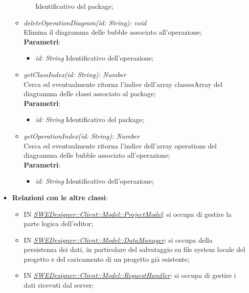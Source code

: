 \documentclass[../DefinizioneDiProdotto.tex]{subfiles}
\begin{document}
\begin{itemize}
\begin{itemize}
\begin{itemize}
								Identificativo del package; \\
							\end{itemize}
							\item \emph{deleteOperationDiagram(id: String): void} \\
							Elimina il diagramma delle bubble associato all'operazione; \\
							\textbf{Parametri}:
							\begin{itemize}
								\item \emph{id: String}
								Identificativo dell'operazione; \\
							\end{itemize}
							\item \emph{getClassIndex(id: String): Number} \\
							Cerca ed eventualmente ritorna l'indice dell'array classesArray del diagramma delle classi associato al package; \\
							\textbf{Parametri}:
							\begin{itemize}
								\item \emph{id: String}
								Identificativo del package; \\
							\end{itemize}
							\item \emph{getOperationIndex(id: String): Number} \\
							Cerca ed eventualmente ritorna l'indice dell'array operations del diagramma delle bubble associato all'operazione; \\
							\textbf{Parametri}:
							\begin{itemize}
								\item \emph{id: String}
								Identificativo dell'operazione; \\
							\end{itemize}
						\end{itemize}
						\item \textbf{Relazioni con le altre classi}:
						\begin{itemize}
							\item IN \hyperlink{SWEDesigner::Client::Model::ProjectModel}{\emph{SWEDesigner::Client::Model::ProjectModel}}: si occupa di gestire la parte logica dell'editor;
							\item IN \hyperlink{SWEDesigner::Client::Model::DataManager}{\emph{SWEDesigner::Client::Model::DataManager}}: si occupa della persistenza dei dati, in particolare del salvataggio su file system locale del progetto e del caricamento di un progetto già esistente;
							\item IN \hyperlink{SWEDesigner::Client::Model::RequestHandler}{\emph{SWEDesigner::Client::Model::RequestHandler}}: si occupa di gestire i dati ricevuti dal server;
						\end{itemize}
					\end{itemize}
				
\end{document}
